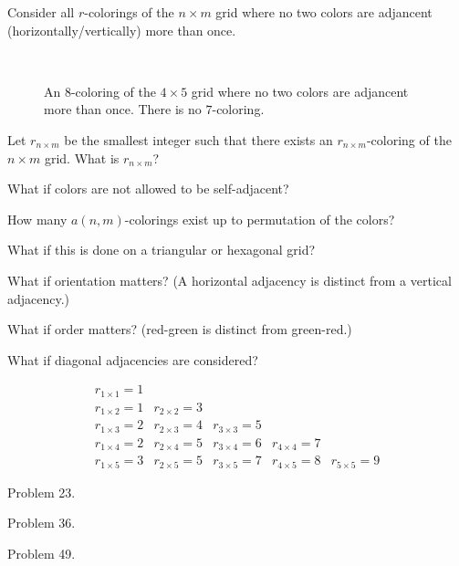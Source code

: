 \documentclass{article}
\begin{document}
Consider all $r$-colorings of the $n \times m$ grid where no two colors
are adjancent (horizontally/vertically) more than once.

\begin{figure}[!h]
  \centering
  \\
  \caption{An $8$-coloring of the $4 \times 5$ grid where no two colors are adjancent
    more than once. There is no $7$-coloring.}
\end{figure}

\begin{question}
  Let $r_{n\times m}$ be the smallest integer such that there exists an
  $r_{n \times m}$-coloring of the $n \times m$ grid. What is $r_{n\times m}$?
\end{question}
\begin{related}
  \item What if colors are not allowed to be self-adjacent?
  \item How many $a(n, m)$-colorings exist up to permutation of the colors?
  \item What if this is done on a triangular or hexagonal grid?
  \item What if orientation matters?
    (A horizontal adjacency is distinct from a vertical adjacency.)
  \item What if order matters? (red-green is distinct from green-red.)
  \item What if diagonal adjacencies are considered?
\end{related}

\begin{note}
  \[
    \begin{array}{ccccc}
      r_{1 \times 1} = 1 \\
      r_{1 \times 2} = 1 & r_{2 \times 2} = 3 \\
      r_{1 \times 3} = 2 & r_{2 \times 3} = 4 & r_{3 \times 3} = 5 \\
      r_{1 \times 4} = 2 & r_{2 \times 4} = 5 & r_{3 \times 4} = 6 & r_{4 \times 4} = 7 \\
      r_{1 \times 5} = 3 & r_{2 \times 5} = 5 & r_{3 \times 5} = 7 & r_{4 \times 5} = 8 & r_{5 \times 5} = 9
    \end{array}
  \]
\end{note}

\begin{references}
  \item Problem 23.
  \item Problem 36.
  \item Problem 49.
\end{references}
\end{document}
